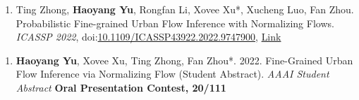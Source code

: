 

\begin{enumerate}[resume]
    \item Ting Zhong, \textbf{Haoyang Yu}, Rongfan Li, Xovee Xu*, Xucheng Luo, Fan Zhou. Probabilistic Fine-grained Urban Flow Inference with Normalizing Flows. \textit{ICASSP 2022}, doi:\href{papers/ICASSP_2022_FUFI.pdf}{10.1109/ICASSP43922.2022.9747900}, \href{https://ieeexplore.ieee.org/document/9747900
    }{\color{Green}Link}

\end{enumerate}


\begin{enumerate}[resume]
    \item \textbf{Haoyang Yu}, Xovee Xu, Ting Zhong, Fan Zhou*. 2022. Fine-Grained Urban Flow Inference via Normalizing Flow (Student Abstract). \textit{AAAI Student Abstract}
    \newline \textbf{\color{red}Oral Presentation Contest, 20/111}
\end{enumerate}